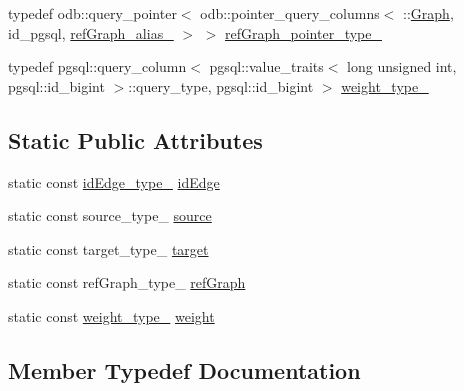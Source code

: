 \begin{DoxyCompactItemize}
\item 
typedef odb\+::query\+\_\+pointer$<$ odb\+::pointer\+\_\+query\+\_\+columns$<$ \+::\hyperlink{class_graph}{Graph}, id\+\_\+pgsql, \hyperlink{structodb_1_1query__columns__base_3_01_1_1_edge_00_01id__pgsql_01_4_a44388dfa7d5b1acd4479b296cff6701a}{ref\+Graph\+\_\+alias\+\_\+} $>$ $>$ \hyperlink{structodb_1_1query__columns_3_01_1_1_edge_00_01id__pgsql_00_01_a_01_4_aa7a5334fc9c390c29710c3937ac9c8ac}{ref\+Graph\+\_\+pointer\+\_\+type\+\_\+}
\item 
typedef pgsql\+::query\+\_\+column$<$ pgsql\+::value\+\_\+traits$<$ long unsigned int, pgsql\+::id\+\_\+bigint $>$\+::query\+\_\+type, pgsql\+::id\+\_\+bigint $>$ \hyperlink{structodb_1_1query__columns_3_01_1_1_edge_00_01id__pgsql_00_01_a_01_4_a9e045ab1b1f5c314f9a4620e1f50a210}{weight\+\_\+type\+\_\+}
\end{DoxyCompactItemize}
\subsection*{Static Public Attributes}
\begin{DoxyCompactItemize}
\item 
static const \hyperlink{structodb_1_1query__columns_3_01_1_1_edge_00_01id__pgsql_00_01_a_01_4_ac2099ffe11e8c8289cfaa30be075ece5}{id\+Edge\+\_\+type\+\_\+} \hyperlink{structodb_1_1query__columns_3_01_1_1_edge_00_01id__pgsql_00_01_a_01_4_ad4b1e3d63508cff38424ce9b9ffa2544}{id\+Edge}
\item 
static const source\+\_\+type\+\_\+ \hyperlink{structodb_1_1query__columns_3_01_1_1_edge_00_01id__pgsql_00_01_a_01_4_a1e9340e8f33863f0cd375a7eb85ef066}{source}
\item 
static const target\+\_\+type\+\_\+ \hyperlink{structodb_1_1query__columns_3_01_1_1_edge_00_01id__pgsql_00_01_a_01_4_a801689c32630da6979f14feb9dd24356}{target}
\item 
static const ref\+Graph\+\_\+type\+\_\+ \hyperlink{structodb_1_1query__columns_3_01_1_1_edge_00_01id__pgsql_00_01_a_01_4_aeaa8367e941f09e321718ccc43c757d0}{ref\+Graph}
\item 
static const \hyperlink{structodb_1_1query__columns_3_01_1_1_edge_00_01id__pgsql_00_01_a_01_4_a9e045ab1b1f5c314f9a4620e1f50a210}{weight\+\_\+type\+\_\+} \hyperlink{structodb_1_1query__columns_3_01_1_1_edge_00_01id__pgsql_00_01_a_01_4_a525f3e591edc29634723a9bd128fc9c6}{weight}
\end{DoxyCompactItemize}


\subsection{Member Typedef Documentation}
\hypertarget{structodb_1_1query__columns_3_01_1_1_edge_00_01id__pgsql_00_01_a_01_4_ac2099ffe11e8c8289cfaa30be075ece5}{}
